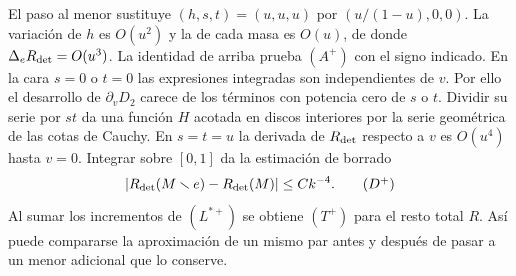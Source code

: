 El paso al menor sustituye $(h,s,t)=(u,u,u)$ por $(u/(1-u),0,0)$. La variación de $h$
es $O(u^2)$ y la de cada masa es $O(u)$, de donde $\Delta_e R_{\rm det}=O(u^3)$.
La identidad de arriba prueba $(A^+)$ con el signo indicado. En la cara $s=0$ o $t=0$ las
expresiones integradas son independientes de $v$. Por ello el desarrollo de $\partial_vD_2$
carece de los términos con potencia cero de $s$ o $t$. Dividir su serie por $st$ da una
función $H$ acotada en discos interiores por la serie geométrica de las cotas de Cauchy.
En $s=t=u$ la derivada de $R_{\rm det}$ respecto a $v$ es $O(u^4)$ hasta $v=0$.
Integrar sobre $[0,1]$ da la estimación de borrado
\[
 |R_{\rm det}(M\setminus e)-R_{\rm det}(M)|\le Ck^{-4}. \tag{$D^+$}
\] Al sumar los incrementos de $(L^{*+})$ se
obtiene $(T^+)$ para el resto total $R$. Así puede compararse la aproximación de un mismo par
antes y después de pasar a un menor adicional que lo conserve.
